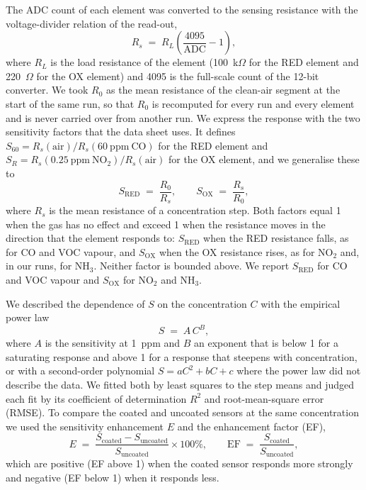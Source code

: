 \documentclass[preprint,11pt]{elsarticle}
\begin{document}
The ADC count of each element was converted to the sensing resistance with the voltage-divider relation of the read-out,
\begin{equation}
R_{s} \;=\; R_{L}\left(\frac{4095}{\mathrm{ADC}}-1\right),
\label{eq:rs}
\end{equation}
where $R_{L}$ is the load resistance of the element (100~k$\Omega$ for the RED element and 220~$\Omega$ for the OX element) and 4095 is the full-scale count of the 12-bit converter. We took $R_{0}$ as the mean resistance of the clean-air segment at the start of the same run, so that $R_0$ is recomputed for every run and every element and is never carried over from another run. We express the response with the two sensitivity factors that the data sheet uses. It defines $S_{60}=R_{s}(\mathrm{air})/R_{s}(60~\mathrm{ppm~CO})$ for the RED element and $S_R=R_{s}(0.25~\mathrm{ppm~NO_2})/R_{s}(\mathrm{air})$ for the OX element, and we generalise these to
\begin{equation}
S_{\mathrm{RED}} \;=\; \frac{R_{0}}{R_{s}}, \qquad S_{\mathrm{OX}} \;=\; \frac{R_{s}}{R_{0}},
\label{eq:S}
\end{equation}
where $R_s$ is the mean resistance of a concentration step. Both factors equal 1 when the gas has no effect and exceed 1 when the resistance moves in the direction that the element responds to: $S_{\mathrm{RED}}$ when the RED resistance falls, as for CO and VOC vapour, and $S_{\mathrm{OX}}$ when the OX resistance rises, as for NO$_2$ and, in our runs, for NH$_3$. Neither factor is bounded above. We report $S_{\mathrm{RED}}$ for CO and VOC vapour and $S_{\mathrm{OX}}$ for NO$_2$ and NH$_3$.

We described the dependence of $S$ on the concentration $C$ with the empirical power law
\begin{equation}
S \;=\; A\,C^{B},
\label{eq:power}
\end{equation}
where $A$ is the sensitivity at 1~ppm and $B$ an exponent that is below 1 for a saturating response and above 1 for a response that steepens with concentration, or with a second-order polynomial $S = aC^{2}+bC+c$ where the power law did not describe the data. We fitted both by least squares to the step means and judged each fit by its coefficient of determination $R^{2}$ and root-mean-square error (RMSE). To compare the coated and uncoated sensors at the same concentration we used the sensitivity enhancement $E$ and the enhancement factor (EF),
\begin{equation}
E \;=\; \frac{S_{\mathrm{coated}}-S_{\mathrm{uncoated}}}{S_{\mathrm{uncoated}}}\times 100\%, \qquad \mathrm{EF} \;=\; \frac{S_{\mathrm{coated}}}{S_{\mathrm{uncoated}}},
\label{eq:enh}
\end{equation}
which are positive (EF above 1) when the coated sensor responds more strongly and negative (EF below 1) when it responds less.
\end{document}

